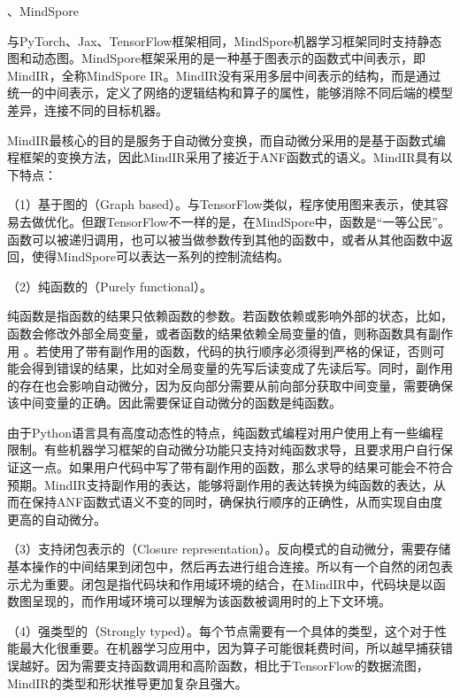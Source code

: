 \documentclass[letterpaper,10pt,english]{sphinxmanual}
\begin{document}
、MindSpore

\sphinxAtStartPar
与PyTorch、Jax、TensorFlow框架相同，MindSpore机器学习框架同时支持静态图和动态图。MindSpore框架采用的是一种基于图表示的函数式中间表示，即MindIR，全称MindSpore
IR。MindIR没有采用多层中间表示的结构，而是通过统一的中间表示，定义了网络的逻辑结构和算子的属性，能够消除不同后端的模型差异，连接不同的目标机器。

\sphinxAtStartPar
MindIR最核心的目的是服务于自动微分变换，而自动微分采用的是基于函数式编程框架的变换方法，因此MindIR采用了接近于ANF函数式的语义。MindIR具有以下特点：

\sphinxAtStartPar
（1）基于图的（Graph
based）。与TensorFlow类似，程序使用图来表示，使其容易去做优化。但跟TensorFlow不一样的是，在MindSpore中，函数是“一等公民”。函数可以被递归调用，也可以被当做参数传到其他的函数中，或者从其他函数中返回，使得MindSpore可以表达一系列的控制流结构。

\sphinxAtStartPar
（2）纯函数的（Purely functional）。

\sphinxAtStartPar
纯函数是指函数的结果只依赖函数的参数。若函数依赖或影响外部的状态，比如，函数会修改外部全局变量，或者函数的结果依赖全局变量的值，则称函数具有副作用
。若使用了带有副作用的函数，代码的执行顺序必须得到严格的保证，否则可能会得到错误的结果，比如对全局变量的先写后读变成了先读后写。同时，副作用的存在也会影响自动微分，因为反向部分需要从前向部分获取中间变量，需要确保该中间变量的正确。因此需要保证自动微分的函数是纯函数。

\sphinxAtStartPar
由于Python语言具有高度动态性的特点，纯函数式编程对用户使用上有一些编程限制。有些机器学习框架的自动微分功能只支持对纯函数求导，且要求用户自行保证这一点。如果用户代码中写了带有副作用的函数，那么求导的结果可能会不符合预期。MindIR支持副作用的表达，能够将副作用的表达转换为纯函数的表达，从而在保持ANF函数式语义不变的同时，确保执行顺序的正确性，从而实现自由度更高的自动微分。

\sphinxAtStartPar
（3）支持闭包表示的（Closure
representation）。反向模式的自动微分，需要存储基本操作的中间结果到闭包中，然后再去进行组合连接。所以有一个自然的闭包表示尤为重要。闭包是指代码块和作用域环境的结合，在MindIR中，代码块是以函数图呈现的，而作用域环境可以理解为该函数被调用时的上下文环境。

\sphinxAtStartPar
（4）强类型的（Strongly
typed）。每个节点需要有一个具体的类型，这个对于性能最大化很重要。在机器学习应用中，因为算子可能很耗费时间，所以越早捕获错误越好。因为需要支持函数调用和高阶函数，相比于TensorFlow的数据流图，MindIR的类型和形状推导更加复杂且强大。
\end{document}
